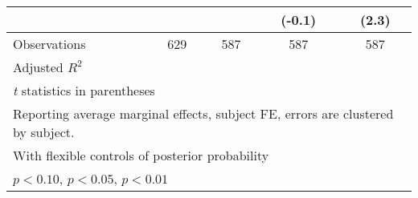 \begin{table}[htbp]
\begin{tabular}{l*{4}{c}}
                &                  &                  &   (-0.1)         &    (2.3)         \\
\hline
Observations    &      629         &      587         &      587         &      587         \\
Adjusted \(R^{2}\)&                  &                  &                  &                  \\
\hline\hline
\multicolumn{5}{l}{\footnotesize \textit{t} statistics in parentheses}\\
\multicolumn{5}{l}{\footnotesize Reporting average marginal effects, subject FE, errors are clustered by subject.}\\
\multicolumn{5}{l}{\footnotesize With flexible controls of posterior probability}\\
\multicolumn{5}{l}{\footnotesize \sym{*} \(p<0.10\), \sym{**} \(p<0.05\), \sym{***} \(p<0.01\)}\\
\end{tabular}
\end{table}
